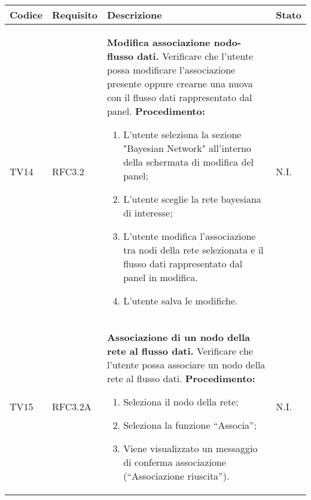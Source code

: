 \begin{table}[!htpb]
	\centering
	\renewcommand{\arraystretch}{2} 
	\begin{tabular}{|l|l|p{10cm}|l|}
		\rowcolor{orange!50}
		\hline
		\textbf{Codice} & \textbf{Requisito}& \textbf{Descrizione} & \textbf{Stato}\\ 
		\hline
		TV14 & RFC3.2 	&
			\textbf{Modifica associazione nodo-flusso dati.}
			\newline
			Verificare che l'utente possa modificare l’associazione presente oppure crearne una nuova con il flusso dati rappresentato dal panel.
			\newline
			\textbf{Procedimento:}
			\begin{enumerate} 
				\item L’utente seleziona la sezione "Bayesian Network" all'interno della schermata di modifica del panel; 
				\item L'utente sceglie la rete bayesiana di interesse;
				\item L’utente modifica l’associazione tra nodi della rete selezionata e il flusso dati rappresentato dal panel in modifica.
				\item L'utente salva le modifiche.
			\end{enumerate} 
			& N.I.\\
		\hline
		TV15 & RFC3.2A &
			\textbf{Associazione di un nodo della rete al flusso dati.} 
			\newline
			Verificare che l’utente possa associare un nodo della rete al flusso dati. 
			\newline 
			\textbf{Procedimento:} 
			\begin{enumerate} 
				\item Seleziona il nodo della rete; 
				\item Seleziona la funzione “Associa”; 
				\item Viene visualizzato un messaggio di conferma associazione (“Associazione riuscita”).		
			\end{enumerate} 
			& N.I.\\
		\hline
	\end{tabular}
\end{table}
